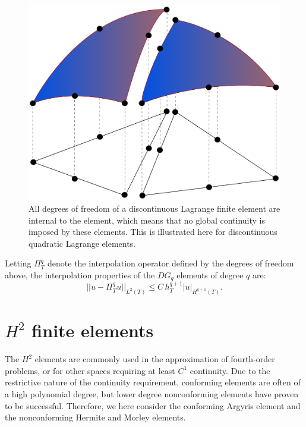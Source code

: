 \begin{figure}
  \centering
  \includegraphics[width=\smallfig]{chapters/kirby-6/pdf/dgspace.pdf}
  \caption{All degrees of freedom of a discontinuous Lagrange finite
    element are internal to the element, which means that no global
    continuity is imposed by these elements. This is illustrated
    here for discontinuous quadratic Lagrange elements.}
\end{figure}

Letting $\Pi_T^q$ denote the interpolation operator defined by the
degrees of freedom above, the interpolation properties of the $DG_q$
elements of degree $q$ are:
\begin{equation}
  ||u - \Pi_T^q u||_{L^2(T)} \leqslant C \, h_T^{q + 1} |u|_{H^{q+1}(T)}.
\end{equation}

\section{$H^2$ finite elements}

The $H^2$ elements are commonly used in the approximation of
fourth-order problems, or for other spaces requiring at least $C^1$
continuity.  Due to the restrictive nature of the continuity
requirement, conforming elements are often of a high polynomial
degree, but lower degree nonconforming elements have proven to be
successful. Therefore, we here consider the conforming Argyris element
and the nonconforming Hermite and Morley elements.

